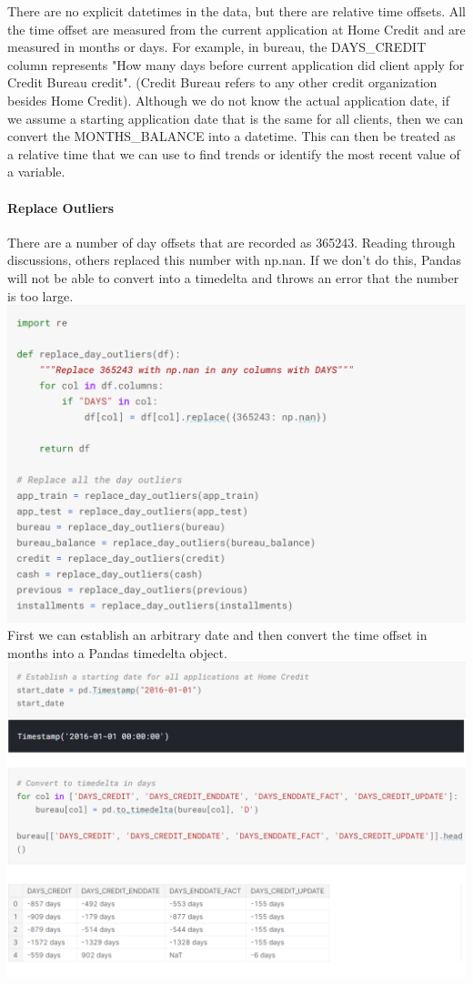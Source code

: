\documentclass[twoside,a4paper]{article}
\begin{document}
There are no explicit datetimes in the data, but there are relative time offsets. All the time offset are measured from the current application at Home Credit and are measured in months or days. For example, in bureau, the DAYS\_CREDIT column represents "How many days before current application did client apply for Credit Bureau credit". (Credit Bureau refers to any other credit organization besides Home Credit). Although we do not know the actual application date, if we assume a starting application date that is the same for all clients, then we can convert the MONTHS\_BALANCE into a datetime. This can then be treated as a relative time that we can use to find trends or identify the most recent value of a variable.
\paragraph{Replace Outliers}
There are a number of day offsets that are recorded as 365243. Reading through discussions, others replaced this number with np.nan. If we don't do this, Pandas will not be able to convert into a timedelta and throws an error that the number is too large.\\
\includegraphics[scale=.8]{load6.png}
\\First we can establish an arbitrary date and then convert the time offset in months into a Pandas timedelta object.\\
\includegraphics[scale=.8]{load7.png}
\end{document}
